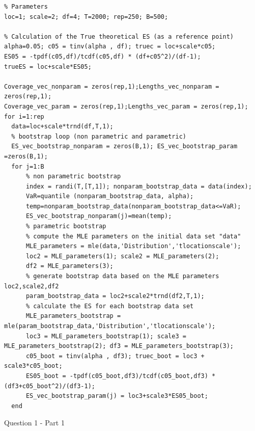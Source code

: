 \documentclass[12pt]{article}
\begin{document}
\begin{Program}[!htb]
\begin{lstlisting}[style=Matlab-editor,basicstyle=\mlttfamily\footnotesize]
%% Question 1 -------------------------------------------------------------
% Parameters
loc=1; scale=2; df=4; T=2000; rep=250; B=500; 

% Calculation of the True theoretical ES (as a reference point)
alpha=0.05; c05 = tinv(alpha , df); truec = loc+scale*c05; 
ES05 = -tpdf(c05,df)/tcdf(c05,df) * (df+c05^2)/(df-1);
trueES = loc+scale*ES05; 

Coverage_vec_nonparam = zeros(rep,1);Lengths_vec_nonparam = zeros(rep,1);
Coverage_vec_param = zeros(rep,1);Lengths_vec_param = zeros(rep,1);
for i=1:rep
  data=loc+scale*trnd(df,T,1); 
  % bootstrap loop (non parametric and parametric)
  ES_vec_bootstrap_nonparam = zeros(B,1); ES_vec_bootstrap_param =zeros(B,1);
  for j=1:B
      % non parametric bootstrap
      index = randi(T,[T,1]); nonparam_bootstrap_data = data(index);
      VaR=quantile (nonparam_bootstrap_data, alpha); 
      temp=nonparam_bootstrap_data(nonparam_bootstrap_data<=VaR); 
      ES_vec_bootstrap_nonparam(j)=mean(temp);
      % parametric bootstrap
      % compute the MLE parameters on the initial data set "data"
      MLE_parameters = mle(data,'Distribution','tlocationscale');
      loc2 = MLE_parameters(1); scale2 = MLE_parameters(2); 
      df2 = MLE_parameters(3);
      % generate bootstrap data based on the MLE parameters loc2,scale2,df2
      param_bootstrap_data = loc2+scale2*trnd(df2,T,1); 
      % calculate the ES for each bootstrap data set 
      MLE_parameters_bootstrap = mle(param_bootstrap_data,'Distribution','tlocationscale');
      loc3 = MLE_parameters_bootstrap(1); scale3 = MLE_parameters_bootstrap(2); df3 = MLE_parameters_bootstrap(3);
      c05_boot = tinv(alpha , df3); truec_boot = loc3 + scale3*c05_boot; 
      ES05_boot = -tpdf(c05_boot,df3)/tcdf(c05_boot,df3) * (df3+c05_boot^2)/(df3-1);
      ES_vec_bootstrap_param(j) = loc3+scale3*ES05_boot;     
  end

\end{lstlisting}
\caption{Question 1 - Part 1}
\label{Question 1 - Part 1}
\end{Program}
\end{document}
